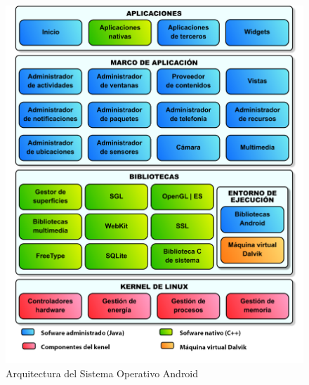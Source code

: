 \begin{figure}[h]
	\begin{center}
		\includegraphics[scale=0.5]{imagenes/pila-android.png}
	\end{center}
	\caption{
		\label{fig:archi}
		Arquitectura del Sistema Operativo Android \cite{AAT}
	}
\end{figure}

